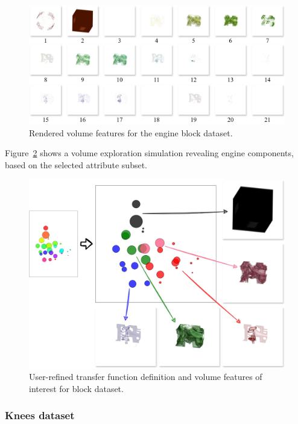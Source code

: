 \begin{figure}[htb!]
    \centering
    \includegraphics[width=\columnwidth]{figs/engine-block-clusters.jpg}
    \caption{Rendered volume features for the engine block dataset.}
    \label{fig:engine-block-clusters}
\end{figure}

Figure~\ref{fig:engine-block-groups} shows a volume exploration simulation revealing engine components, based on the selected attribute subset.

\begin{figure}[htb!]
    \centering
    \includegraphics[width=\columnwidth]{figs/engine-block-groups.jpg}
    \caption{User-refined transfer function definition and volume features of interest for block dataset.}
    \label{fig:engine-block-groups}
\end{figure}

\subsubsection{Knees dataset}
\label{subsubsect:knees-dataset}

